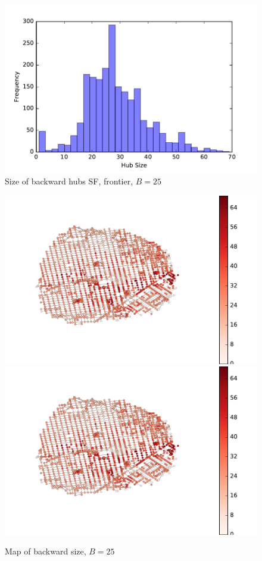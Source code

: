 \begin{figure} 
\begin{center}
\includegraphics[scale=0.5]{TexImg/SF_bwd_hub_size.pdf}
\end{center}
\caption{Size of backward hubs SF, frontier, $B=25$}\label{fig:SF_bwd_size}
\end{figure}


\begin{figure}
\begin{center}
\includegraphics[clip, trim=1.7cm 2.2cm 4.7cm 1.7cm,scale=0.8]{TexImg/SF_hub_sizes.pdf}
\includegraphics[clip, trim=13cm 0cm 1.1cm 0cm,scale=0.45]{TexImg/SF_hub_sizes.pdf}
\end{center}
\caption{Map of backward size, $B=25$}\label{fig:SF_hub_size_map}
\end{figure}